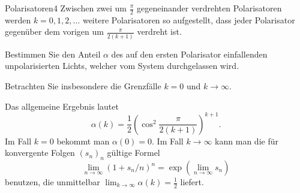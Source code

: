 \begin{problem}{Polarisatoren}{4}
Zwischen zwei um $\frac{\pi}{2}$ gegeneinander verdrehten Polarisatoren werden $k=0,1,2,\dots$ weitere Polarisatoren so aufgestellt, dass jeder Polarisator gegenüber dem vorigen um $\frac{\pi}{2(k+1)}$ verdreht ist.

Bestimmen Sie den Anteil $\alpha$ des auf den ersten Polarisator einfallenden unpolarisierten Lichts, welcher vom System durchgelassen wird.

Betrachten Sie insbesondere die Grenzfälle $k=0$ und $k \to \infty$.
\begin{solution}
Das allgemeine Ergebnis lautet
\[
\alpha(k)=\frac{1}{2}\left( \cos^2\frac{\pi}{2(k+1)} \right)^{k+1}.
\]
Im Fall $k=0$ bekommt man $\alpha(0)=0$. Im Fall $k \to \infty$ kann man die für konvergente Folgen $(s_{n})_{n}$ gültige Formel
\[
\lim_{n \to \infty} (1 + s_{n}/n)^{n} = \exp ( \lim_{n \to \infty} s_{n})
\]
benutzen, die unmittelbar $\lim_{k\to\infty} \alpha(k) = \frac{1}{2}$ liefert.
\end{solution}
\end{problem}


